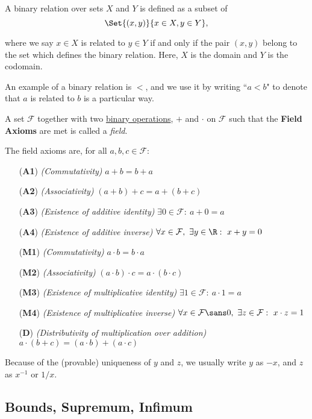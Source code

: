 A binary relation over sets $X$ and $Y$ is defined as a subset of
$$
  \Set{(x,y)}{x\in X,y\in Y},
$$

where we say $x\in X$ is related to $y\in Y$ if and only if the pair $(x,y)$
belong to the set which defines the binary relation. Here, $X$ is the domain
and $Y$ is the codomain.

An example of a binary relation is $<$, and we use it by writing ``$a<b$" to
denote that $a$ is related to $b$ is a particular way.

\label{aec6040}

A set $\mathcal F$ together with two \href{d526017}{binary operations}, $+$ and
$\cdot$ on $\mathcal F$ such that the \textbf{Field Axioms} are met is called a
\textit{field}.

The field axioms are, for all $a,b,c\in\mathcal F$:
\begin{itemize}
  \item [(\textbf{A1})] \textit{(Commutativity)} $a+b=b+a$
  \item [(\textbf{A2})] \textit{(Associativity)} $(a+b)+c=a+(b+c)$
  \item [(\textbf{A3})] \textit{(Existence of additive identity)} $\exists0\in\mathcal F:\ a+0=a$
  \item [(\textbf{A4})] \textit{(Existence of additive inverse)} $\forall
        x\in\mathcal F,\ \exists y\in\R:\ x+y=0$
  \item [(\textbf{M1})] \textit{(Commutativity)} $a\cdot b=b\cdot a$
  \item [(\textbf{M2})] \textit{(Associativity)} $(a\cdot b)\cdot c=a\cdot
        (b\cdot c)$
  \item [(\textbf{M3})] \textit{(Existence of multiplicative identity)} $\exists1\in\mathcal F:\ a\cdot1=a$
  \item [(\textbf{M4})] \textit{(Existence of multiplicative inverse)} $\forall
        x\in\mathcal F\sans0,\ \exists z\in\mathcal F:\ x\cdot z=1$
  \item [(\textbf{D})] \textit{(Distributivity of multiplication over addition)}
        $a\cdot(b+c)=(a\cdot b)+(a\cdot c)$
\end{itemize}

Because of the (provable) uniqueness of $y$ and $z$, we usually write $y$ as
$-x$, and $z$ as $x^{-1}$ or $1/x$.

\subsection{Bounds, Supremum, Infimum}\label{b81c8db}

